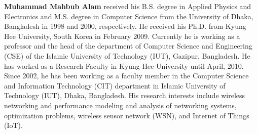 \documentclass{ieeeaccess}
\begin{document}
\begin{IEEEbiography}{\textbf{Muhammad Mahbub Alam}}  received his B.S. degree in Applied Physics and Electronics and
M.S. degree in Computer Science from the University of Dhaka, Bangladesh in 1998 and 2000,
respectively. He received his Ph.D. from Kyung Hee University, South Korea in February
2009. Currently he is working as a professor and the head of the department of Computer
Science and Engineering (CSE) of the Islamic University of Technology (IUT), Gazipur,
Bangladesh. He has worked as a Research Faculty in Kyung-Hee University until April, 2010.
Since 2002, he has been working as a faculty member in the Computer Science and
Information Technology (CIT) department in Islamic University of Technology (IUT), Dhaka,
Bangladesh. His research interests include wireless networking and performance modeling
and analysis of networking systems, optimization problems, wireless sensor network (WSN),
and Internet of Things (IoT).
\end{IEEEbiography}



\EOD
\end{document}
